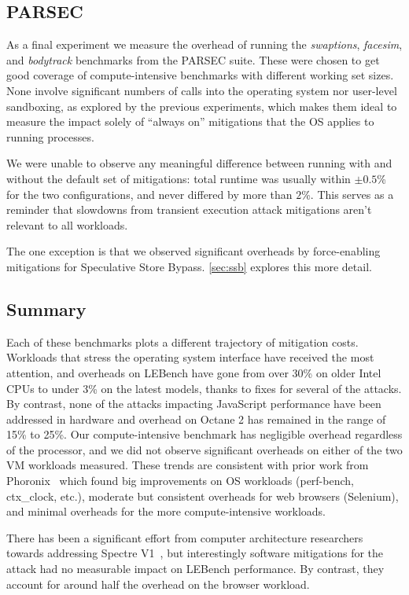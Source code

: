 \subsection{PARSEC}
\label{sec:benchmarks:parsec}
As a final experiment we measure the overhead of running the \textit{swaptions}, \textit{facesim}, and \textit{bodytrack} benchmarks from the PARSEC suite.
These were chosen to get good coverage of compute-intensive benchmarks with different working set sizes.
None involve significant numbers of calls into the operating system nor user-level sandboxing, as explored by the previous experiments, which makes them ideal to measure the impact solely of ``always on'' mitigations that the OS applies to running processes.

We were unable to observe any meaningful difference between running with and without the default set of mitigations: total runtime was usually within $\pm0.5$\% for the two configurations, and never differed by more than $2$\%.
This serves as a reminder that slowdowns from transient execution attack mitigations aren't relevant to all workloads.

The one exception is that we observed significant overheads by force-enabling mitigations for Speculative Store Bypass.
\autoref{sec:ssb} explores this more detail.

\subsection{Summary}
Each of these benchmarks plots a different trajectory of mitigation costs.
Workloads that stress the operating system interface have received the most attention, and overheads on LEBench have gone from over 30\% on older Intel CPUs to under 3\% on the latest models, thanks to fixes for several of the attacks.
By contrast, none of the attacks impacting JavaScript performance have been addressed in hardware and overhead on Octane 2 has remained in the range of 15\% to 25\%.
Our compute-intensive benchmark has negligible overhead regardless of the processor, and we did not observe significant overheads on either of the two VM workloads measured.
These trends are consistent with prior work from Phoronix~\cite{phoronix:three-years} which found big improvements on OS workloads (perf-bench, ctx\_clock, etc.), moderate but consistent overheads for web browsers (Selenium), and minimal overheads for the more compute-intensive workloads.

There has been a significant effort from computer architecture researchers towards addressing Spectre V1~\cite{barber:specshield, weisse:nda, ainsworth:muontrap,yu:stt,yu:sdo}, but interestingly software mitigations for the attack had no measurable impact on LEBench performance.
By contrast, they account for around half the overhead on the browser workload.

